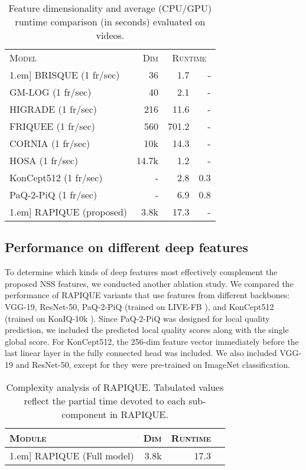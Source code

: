 \documentclass[transmag]{IEEEtran}
\begin{document}
\begin{table}[!t]
\setlength{\tabcolsep}{10pt}
\renewcommand{\arraystretch}{1.}
\centering\footnotesize
\caption{Feature dimensionality and average (CPU/GPU) runtime comparison (in seconds) evaluated on  videos.}
\label{table:complexity}
\begin{tabular}{lrrr}
\toprule
\textsc{Model} & \textsc{Dim} & \multicolumn{2}{c}{\textsc{Runtime}} \\\cline{3-4}\-1.em]
BRISQUE (1 fr/sec) & 36 & 1.7 & - \\
GM-LOG (1 fr/sec) & 40 & 2.1 & - \\
HIGRADE (1 fr/sec) & 216 & 11.6 & - \\
FRIQUEE (1 fr/sec) & 560 & 701.2 & - \\
CORNIA (1 fr/sec) &  10k & 14.3 & - \\
HOSA (1 fr/sec) &  14.7k & 1.2 & -  \\
KonCept512 (1 fr/sec) & - & 2.8 & 0.3 \\
PaQ-2-PiQ (1 fr/sec) & - & 6.9 & 0.8 \\
\hline\-1.em]
RAPIQUE (proposed) & 3.8k & 17.3 & - \\
\bottomrule
\end{tabular}
\end{table}

\subsection{Performance on different deep features}
\label{ssec:perf-deep}

To determine which kinds of deep features most effectively complement the proposed NSS features, we conducted another ablation study. We compared the performance of RAPIQUE variants that use features from different backbones: VGG-19, ResNet-50, PaQ-2-PiQ (trained on LIVE-FB \cite{ying2019patches}), and KonCept512 (trained on KonIQ-10k \cite{hosu2020koniq}). Since PaQ-2-PiQ was designed for local quality prediction, we included the predicted  local quality scores along with the single global score. For KonCept512, the 256-dim feature vector immediately before the last linear layer in the fully connected head was included. We also included VGG-19 and ResNet-50, except for they were pre-trained on ImageNet classification.

\begin{table}[!t]
\setlength{\tabcolsep}{10pt}
\renewcommand{\arraystretch}{1.}
\centering\footnotesize
\caption{Complexity analysis of RAPIQUE. Tabulated values reflect the partial time devoted to each sub-component in RAPIQUE.}
\label{table:partial_complexity}
\begin{tabular}{lrrc}
\toprule
\textsc{Module} & \textsc{Dim} & \textsc{Runtime} \\
\hline\-1.em]
RAPIQUE (Full model) & 3.8k & 17.3 \\
\bottomrule
\end{tabular}
\end{table}
\end{document}
